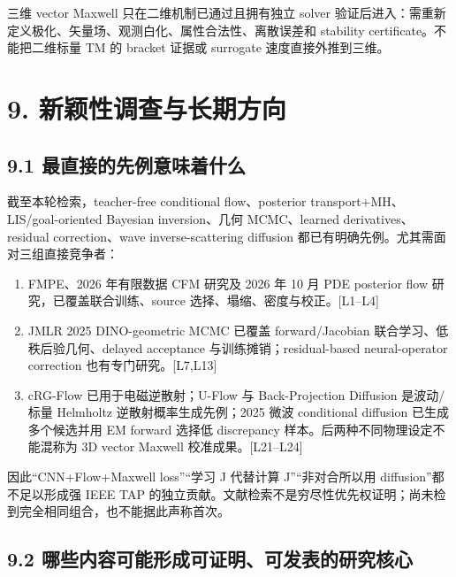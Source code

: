 \documentclass[
  11pt,
  a4paper,
]{article}
\providecommand{\tightlist}{%
  \setlength{\itemsep}{0pt}\setlength{\parskip}{0pt}}
\begin{document}
三维 vector Maxwell 只在二维机制已通过且拥有独立 solver
验证后进入：需重新定义极化、矢量场、观测白化、属性合法性、离散误差和
stability certificate。不能把二维标量 TM 的 bracket 证据或 surrogate
速度直接外推到三维。

\hypertarget{ux65b0ux9896ux6027ux8c03ux67e5ux4e0eux957fux671fux65b9ux5411}{%
\section{9.
新颖性调查与长期方向}\label{ux65b0ux9896ux6027ux8c03ux67e5ux4e0eux957fux671fux65b9ux5411}}

\hypertarget{ux6700ux76f4ux63a5ux7684ux5148ux4f8bux610fux5473ux7740ux4ec0ux4e48}{%
\subsection{9.1
最直接的先例意味着什么}\label{ux6700ux76f4ux63a5ux7684ux5148ux4f8bux610fux5473ux7740ux4ec0ux4e48}}

截至本轮检索，teacher-free conditional flow、posterior
transport+MH、LIS/goal-oriented Bayesian inversion、几何 MCMC、learned
derivatives、residual correction、wave inverse-scattering diffusion
都已有明确先例。尤其需面对三组直接竞争者：

\begin{enumerate}
\def\labelenumi{\arabic{enumi}.}
\tightlist
\item
  FMPE、2026 年有限数据 CFM 研究及 2026 年 10 月 PDE posterior flow
  研究，已覆盖联合训练、source 选择、塌缩、密度与校正。{[}L1--L4{]}
\item
  JMLR 2025 DINO-geometric MCMC 已覆盖 forward/Jacobian
  联合学习、低秩后验几何、delayed acceptance 与训练摊销；residual-based
  neural-operator correction 也有专门研究。{[}L7,L13{]}
\item
  cRG-Flow 已用于电磁逆散射；U-Flow 与 Back-Projection Diffusion
  是波动/标量 Helmholtz 逆散射概率生成先例；2025 微波 conditional
  diffusion 已生成多个候选并用 EM forward 选择低 discrepancy
  样本。后两种不同物理设定不能混称为 3D vector Maxwell
  校准成果。{[}L21--L24{]}
\end{enumerate}

因此``CNN+Flow+Maxwell loss''``学习 J 代替计算 J''``非对合所以用
diffusion''都不足以形成强 IEEE TAP
的独立贡献。文献检索不是穷尽性优先权证明；尚未检到完全相同组合，也不能据此声称首次。

\hypertarget{ux54eaux4e9bux5185ux5bb9ux53efux80fdux5f62ux6210ux53efux8bc1ux660eux53efux53d1ux8868ux7684ux7814ux7a76ux6838ux5fc3}{%
\subsection{9.2
哪些内容可能形成可证明、可发表的研究核心}\label{ux54eaux4e9bux5185ux5bb9ux53efux80fdux5f62ux6210ux53efux8bc1ux660eux53efux53d1ux8868ux7684ux7814ux7a76ux6838ux5fc3}}
\end{document}
